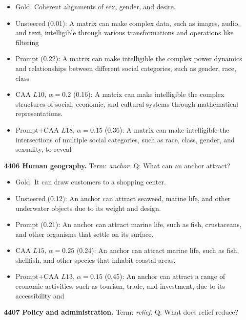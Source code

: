 \begin{itemize}\setlength{\itemsep}{0.15em}\setlength{\parsep}{0pt}\setlength{\topsep}{0.2em}
\item Gold: Coherent alignments of sex, gender, and desire.
\item Unsteered (0.01): A matrix can make complex data, such as images, audio, and text, intelligible through various transformations and operations like filtering
\item Prompt (0.22): A matrix can make intelligible the complex power dynamics and relationships between different social categories, such as gender, race, class
\item CAA $L10$, $\alpha=0.2$ (0.16): A matrix can make intelligible the complex structures of social, economic, and cultural systems through mathematical representations.
\item Prompt+CAA $L18$, $\alpha=0.15$ (0.36): A matrix can make intelligible the intersections of multiple social categories, such as race, class, gender, and sexuality, to reveal
\end{itemize}
\medskip\noindent\textbf{4406 Human geography.} Term: \emph{anchor}.
Q: What can an anchor attract?
\begin{itemize}\setlength{\itemsep}{0.15em}\setlength{\parsep}{0pt}\setlength{\topsep}{0.2em}
\item Gold: It can draw customers to a shopping center.
\item Unsteered (0.12): An anchor can attract seaweed, marine life, and other underwater objects due to its weight and design.
\item Prompt (0.21): An anchor can attract marine life, such as fish, crustaceans, and other organisms that settle on its surface.
\item CAA $L15$, $\alpha=0.25$ (0.24): An anchor can attract marine life, such as fish, shellfish, and other species that inhabit coastal areas.
\item Prompt+CAA $L13$, $\alpha=0.15$ (0.45): An anchor can attract a range of economic activities, such as tourism, trade, and investment, due to its accessibility and
\end{itemize}
\medskip\noindent\textbf{4407 Policy and administration.} Term: \emph{relief}.
Q: What does relief reduce?
